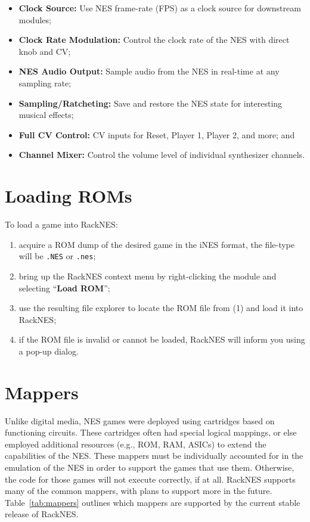 \documentclass[12pt,a4paper]{article}
\begin{document}
\begin{itemize}
  \item \textbf{Clock Source:} Use NES frame-rate (FPS) as a clock source for downstream modules;
  \item \textbf{Clock Rate Modulation:} Control the clock rate of the NES with direct knob and CV;
  \item \textbf{NES Audio Output:} Sample audio from the NES in real-time at any sampling rate;
  \item \textbf{Sampling/Ratcheting:} Save and restore the NES state for interesting musical effects;
  \item \textbf{Full CV Control:} CV inputs for Reset, Player 1, Player 2, and more; and
  \item \textbf{Channel Mixer:} Control the volume level of individual synthesizer channels.
\end{itemize}


\section{Loading ROMs}

To load a game into RackNES:
\begin{enumerate}
  \item acquire a ROM dump of the desired game in the iNES format, the file-type will be \texttt{.NES} or \texttt{.nes};
  \item bring up the RackNES context menu by right-clicking the module and selecting ``\textbf{Load ROM}'';
  \item use the resulting file explorer to locate the ROM file from (1) and load it into RackNES;
  \item if the ROM file is invalid or cannot be loaded, RackNES will inform you using a pop-up dialog.
\end{enumerate}


\section{Mappers}

Unlike digital media, NES games were deployed using cartridges based on functioning circuits. These cartridges often had special logical mappings, or else employed additional resources (e.g., ROM, RAM, ASICs) to extend the capabilities of the NES. These mappers must be individually accounted for in the emulation of the NES in order to support the games that use them. Otherwise, the code for those games will not execute correctly, if at all. RackNES supports many of the common mappers, with plans to support more in the future. Table~\ref{tab:mappers} outlines which mappers are supported by the current stable release of RackNES.
\end{document}
